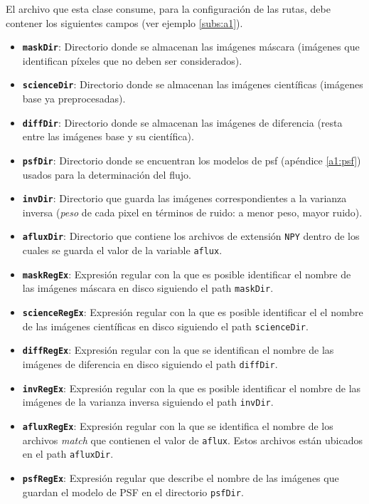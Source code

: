 El archivo que esta clase consume, para la configuraci\'on de las rutas, debe contener los siguientes campos (ver ejemplo \ref{subs:a1}).
\begin{itemize}
\item \textbf{\texttt{maskDir}}: Directorio donde se almacenan las im\'agenes m\'ascara (im\'agenes que identifican p\'ixeles que no deben ser considerados).
\item \textbf{\texttt{scienceDir}}: Directorio donde se almacenan las im\'agenes cient\'ificas (im\'agenes base ya preprocesadas).
\item \textbf{\texttt{diffDir}}: Directorio donde se almacenan las im\'agenes de diferencia (resta entre las im\'agenes base y su cient\'ifica).
\item \textbf{\texttt{psfDir}}: Directorio donde se encuentran los modelos de psf (ap\'endice \ref{a1:psf}) usados para la determinaci\'on del flujo.
\item \textbf{\texttt{invDir}}: Directorio que guarda las im\'agenes correspondientes a la varianza inversa (\textit{peso} de cada pixel en t\'erminos de ruido: a menor peso, mayor ruido).
\item \textbf{\texttt{afluxDir}}: Directorio que contiene los archivos de extensi\'on \texttt{NPY} dentro de los cuales se guarda el valor de la variable \texttt{aflux}.
\item \textbf{\texttt{maskRegEx}}: Expresi\'on regular con la que es posible identificar el nombre de las im\'agenes m\'ascara en disco siguiendo el path \texttt{maskDir}.
\item \textbf{\texttt{scienceRegEx}}: Expresi\'on regular con la que es posible identificar el el nombre de las im\'agenes cient\'ificas en disco siguiendo el path \texttt{scienceDir}.
\item \textbf{\texttt{diffRegEx}}: Expresi\'on regular con la que se identifican el nombre de las im\'agenes de diferencia en disco siguiendo el path \texttt{diffDir}.
\item \textbf{\texttt{invRegEx}}: Expresi\'on regular con la que es posible identificar el nombre de las im\'agenes de la varianza inversa siguiendo el path \texttt{invDir}.
\item \textbf{\texttt{afluxRegEx}}: Expresi\'on regular con la que se identifica el nombre de los archivos \textit{match} que contienen el valor de \texttt{aflux}. Estos archivos est\'an ubicados en el path \texttt{afluxDir}.
\item \textbf{\texttt{psfRegEx}}: Expresi\'on regular que describe el nombre de las im\'agenes que guardan el modelo de PSF en el directorio \texttt{psfDir}.
\end{itemize}


